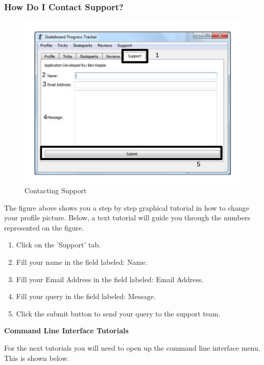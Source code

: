 \subsubsection{How Do I Contact Support?} \label{ContactSupport}

\begin{figure}[H]
    \includegraphics[width=\textwidth]{./Manual/Images/Support.pdf}
    \caption{Contacting Support} \label{fig:Support}
\end{figure}

The figure above shows you a step by step graphical tutorial in how to change your profile picture. Below, a text tutorial will guide you through the numbers represented on the figure.

\begin{enumerate}
\item Click on the 'Support' tab.
\item Fill your name in the field labeled: Name.
\item Fill your Email Address in the field labeled: Email Address.
\item Fill your query in the field labeled: Message.
\item Click the submit button to send your query to the support team.
\end{enumerate}


\textbf{Command Line Interface Tutorials}

For the next tutorials you will need to open up the command line interface menu. This is shown below.

